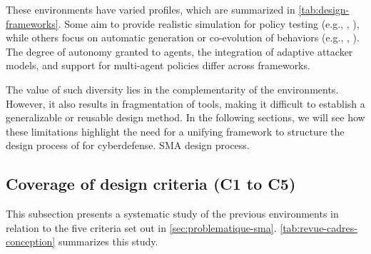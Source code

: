 \medskip

These environments have varied profiles, which are summarized in \autoref{tab:design-frameworks}. Some aim to provide realistic simulation for policy testing (e.g., , ), while others focus on automatic generation or co-evolution of behaviors (e.g., , ). The degree of autonomy granted to agents, the integration of adaptive attacker models, and support for multi-agent policies differ across frameworks.

The value of such diversity lies in the complementarity of the environments. However, it also results in fragmentation of tools, making it difficult to establish a generalizable or reusable design method. In the following sections, we will see how these limitations highlight the need for a unifying framework to structure the design process of  for cyberdefense. {SMA} design process.

\subsection{Coverage of design criteria (C1 to C5)}

This subsection presents a systematic study of the previous environments in relation to the five criteria set out in \autoref{sec:problematique-sma}. \autoref{tab:revue-cadres-conception} summarizes this study.

